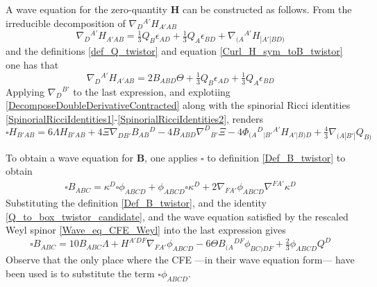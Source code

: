 \documentclass[10pt,a4paper]{article}
\theoremstyle{plain}
\def\bmB{{\bm B}}
\def\bmH{{\bm H}}
\begin{document}
{A wave equation for the zero-quantity $\bmH$ can be constructed as follows.
From the irreducible decomposition of $\nabla_D{}^{A'}H_{A'AB}$
\[
\nabla_{D}{}^{A'}H_{A'AB} = \tfrac{1}{3} Q_{B} \epsilon _{AD} + \tfrac{1}{3} Q_{A} \epsilon _{BD} + \nabla_{(A}{}^{A'}H_{|A'|BD)}
\]
and the definitions \eqref{def_Q_twistor} and equation
\eqref{Curl_H_sym_toB_twistor} one has that
\[
\nabla_{D}{}^{A'}H_{A'AB} = 2 B_{ABD} \Theta
+ \tfrac{1}{3} Q_{B} \epsilon _{AD} + \tfrac{1}{3} Q_{A} \epsilon _{BD}
\]
Applying $\nabla_{D}{}^{B'}$ to the last expression, and
explotiing \eqref{DecomposeDoubleDerivativeContracted} along with
the spinorial Ricci identities
\eqref{SpinorialRicciIdentities1}-\eqref{SpinorialRicciIdentities2},
 renders
\begin{equation}\label{wave_H_twistor}
  \square H_{B'AB} = 6 \Lambda H_{B'AB} + 4 \Xi
  \nabla_{DB'}B_{AB}{}^{D}  -4 B_{ABD} \nabla^{D}{}_{B'}\Xi   -4 \Phi_{(A}{}^{D}{}_{|B'}{}^{A'}H_{A'|B)D}
  + \tfrac{4}{3} \nabla_{(A|B'|}Q_{B)}
\end{equation}

To obtain a wave equation for $\bmB$, one applies $\square$ to
definition \eqref{Def_B_twistor} to obtain
\begin{align}
\square B_{ABC} = \kappa ^{D} \square \phi _{ABCD} + \phi _{ABCD}
\square \kappa ^{D} + 2 \nabla_{FA'}\phi _{ABCD} \nabla^{FA'}\kappa
^{D}
\end{align}
Substituting the definition \eqref{Def_B_twistor}, and the identity
\eqref{Q_to_box_twistor_candidate}, and the wave equation satisfied by
the rescaled Weyl spinor \eqref{Wave_eq_CFE_Weyl} into the last expression gives
\begin{equation}\label{wave_B_twistor}
\square B_{ABC} = 10 B_{ABC} \Lambda + H^{A'DF} \nabla_{FA'}\phi _{ABCD}  -6 \Theta B_{(A}{}^{DF}\phi
_{BC)DF} + \tfrac{2}{3} \phi _{ABCD} Q^{D}
\end{equation}
Observe that the only place where the CFE ---in their wave equation form---
have been used is to substitute the term $\square \phi _{ABCD}$.

}
\end{document}
